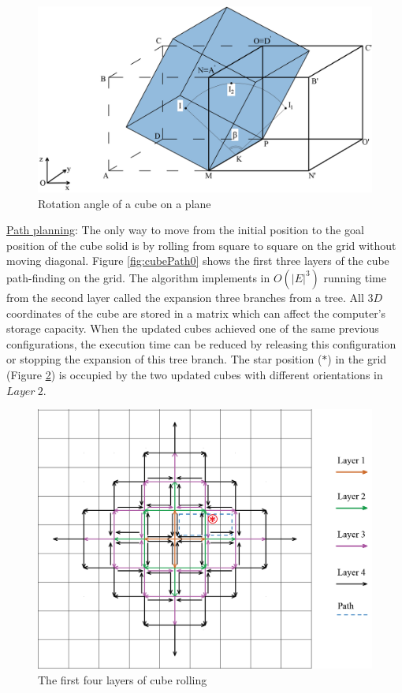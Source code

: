 \begin{figure}[H]
\centering
	\includegraphics[width=1\textwidth]{image/cubeGeo1.png}
	\caption{Rotation angle of a cube on a plane}
	\label{fig:cubeGeo1}
\end{figure}

\noindent\uline{Path planning}: 
The only way to move from the initial position to the goal position of the cube solid is by rolling from square to square on the grid without moving diagonal. 
Figure \ref{fig:cubePath0} shows the first three layers of the cube path-finding on the grid. 
The algorithm implements in $O(|E|^3)$ running time from the second layer called the expansion three branches from a tree. 
All $3D$ coordinates of the cube are stored in a matrix which can affect the computer's storage capacity. 
When the updated cubes achieved one of the same previous configurations, the execution time can be reduced by releasing this configuration or stopping the expansion of this tree branch.
The star position ($*$) in the grid (Figure \ref{fig:cubeLayer}) is occupied by the two updated cubes with different orientations in $Layer\ 2$. \\

\begin{figure}[H]
\centering
	\includegraphics[width=1\textwidth]{image/cubePath00.png}
	\caption{The first four layers of cube rolling}
	\label{fig:cubeLayer}
\end{figure}
%

